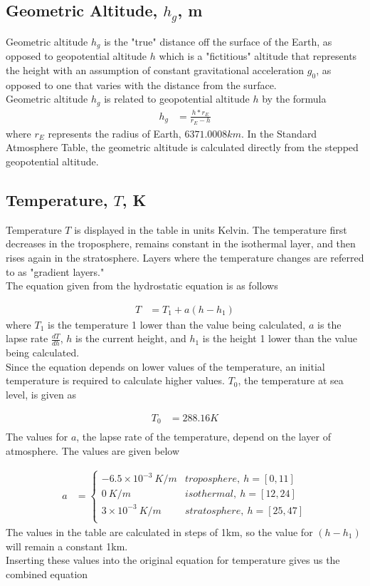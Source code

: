 \documentclass{article}
\begin{document}
\subsection{Geometric Altitude, $h_g$, m}
Geometric altitude $h_g$ is the "true" distance off the surface of the Earth, as opposed to geopotential altitude $h$ which is a "fictitious" altitude that represents the height with an assumption of constant gravitational acceleration $g_0$, as opposed to one that varies with the distance from the surface.\\
Geometric altitude $h_g$ is related to geopotential altitude $h$ by the formula 
\begin{align}
    h_g &= \frac{h * r_E}{r_E - h}
\end{align}
where $r_E$ represents the radius of Earth, $6371.0008 km$. In the Standard Atmosphere Table, the geometric altitude is calculated directly from the stepped geopotential altitude.

\subsection{Temperature, $T$, K}
Temperature $T$ is displayed in the table in units Kelvin. The temperature first decreases in the troposphere, remains constant in the isothermal layer, and then rises again in the stratosphere. Layers where the temperature changes are referred to as "gradient layers." \\
The equation given from the hydrostatic equation is as follows

\begin{align*}
    T &= T_1 + a(h - h_1)
\end{align*}
where $T_1$ is the temperature 1 lower than the value being calculated, $a$ is the lapse rate $\frac{dT}{dh}$, $h$ is the current height, and $h_1$ is the height 1 lower than the value being calculated. \\ 
Since the equation depends on lower values of the temperature, an initial temperature is required to calculate higher values. $T_0$, the temperature at sea level, is given as 

\begin{align*}
    T_{0} &= 288.16 K \\
\end{align*}
The values for $a$, the lapse rate of the temperature, depend on the layer of atmosphere. The values are given below

\begin{align*}
    a &= \begin{cases}
    -6.5\times10^{-3}\  K/m   & troposphere,\ h = [0,11] \\
    0 \ K/m                  & isothermal,\ h = [12,24] \\
    3\times10^{-3}\ K/m     & stratosphere,\ h = [25,47] \\
    \end{cases}
\end{align*}
The values in the table are calculated in steps of 1km, so the value for $(h-h_1)$ will remain a constant 1km.\\
Inserting these values into the original equation for temperature gives us the combined equation
\end{document}
